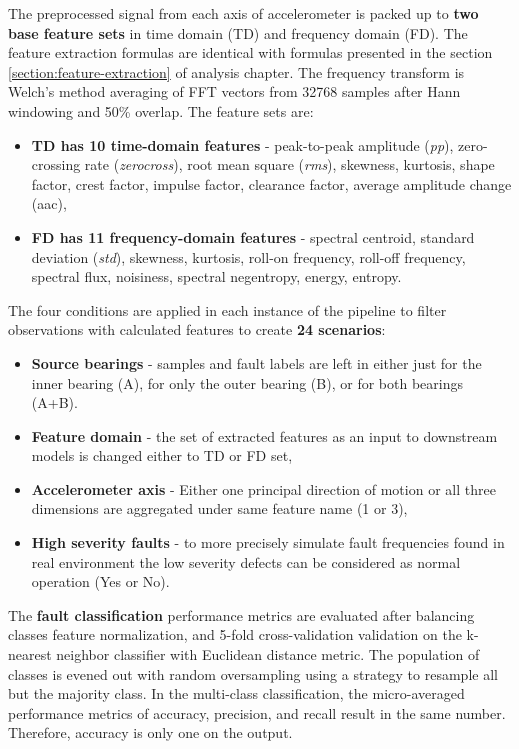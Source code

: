 The preprocessed signal from each axis of accelerometer is packed up to \textbf{two base feature sets} in time domain (TD) and frequency domain (FD). The feature extraction formulas are identical with formulas presented in the section \ref{section:feature-extraction} of analysis chapter. The frequency transform is Welch's method averaging of FFT vectors from 32768 samples after Hann windowing and 50\% overlap. The feature sets are:
\begin{itemize}
\itemsep0pt
\item \textbf{TD has 10 time-domain features} - peak-to-peak amplitude (\emph{pp}), zero-crossing rate (\emph{zerocross}), root mean square (\emph{rms}), skewness, kurtosis, shape factor, crest factor, impulse factor, clearance factor, average amplitude change (aac), 
\item \textbf{FD has 11 frequency-domain features} - spectral centroid, standard deviation (\emph{std}), skewness, kurtosis, roll-on frequency, roll-off frequency, spectral flux, noisiness, spectral negentropy, energy, entropy.
\end{itemize}
 
The four conditions are applied in each instance of the pipeline to filter observations with calculated features to create \textbf{24 scenarios}:
\begin{itemize}
\itemsep0pt
\item \textbf{Source bearings} - samples and fault labels are left in either just for the inner bearing (A), for only the outer bearing (B), or for both bearings (A+B).
\item \textbf{Feature domain} - the set of extracted features as an input to downstream models is changed either to TD or FD set,
\item \textbf{Accelerometer axis} - Either one principal direction of motion or all three dimensions are aggregated under same feature name (1 or 3),
\item \textbf{High severity faults} - to more precisely simulate fault frequencies found in real environment the low severity defects can be considered as normal operation (Yes or No).
\end{itemize}

The \textbf{fault classification} performance metrics are evaluated after balancing classes feature normalization, and 5-fold cross-validation validation on the k-nearest neighbor classifier with Euclidean distance metric. The population of classes is evened out with random oversampling using a strategy to resample all but the majority class. In the multi-class classification, the micro-averaged performance metrics of accuracy, precision, and recall result in the same number. Therefore, accuracy is only one on the output. 


